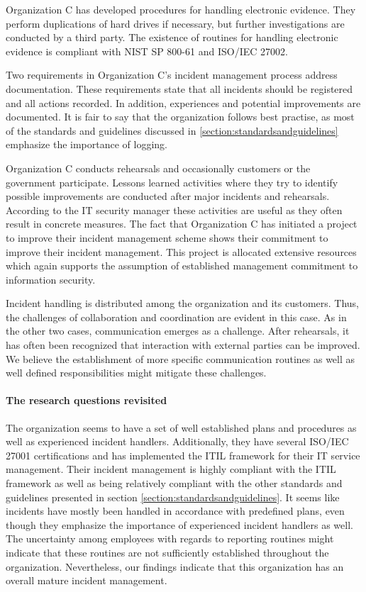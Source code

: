 Organization C has developed procedures for handling electronic evidence. They perform duplications of hard drives if necessary, but further investigations are conducted by a third party. The existence of routines for handling electronic evidence is compliant with NIST SP 800-61 and ISO/IEC 27002.

Two requirements in Organization C's incident management process address documentation. These requirements state that all incidents should be registered and all actions recorded. In addition, experiences and potential improvements are documented. It is fair to say that the organization follows best practise, as most of the standards and guidelines discussed in \ref{section:standardsandguidelines} emphasize the importance of logging.

Organization C conducts rehearsals and occasionally customers or the government participate. Lessons learned activities where they try to identify possible improvements are conducted after major incidents and rehearsals. According to the IT security manager these activities are useful as they often result in concrete measures. The fact that Organization C has initiated a project to improve their incident management scheme shows their commitment to improve their incident management. This project is allocated extensive resources which again supports the assumption of established management commitment to information security.

Incident handling is distributed among the organization and its customers. Thus, the challenges of collaboration and coordination are evident in this case. As in the other two cases, communication emerges as a challenge. After rehearsals, it has often been recognized that interaction with external parties can be improved. We believe the establishment of more specific communication routines as well as well defined responsibilities might mitigate these challenges.

\paragraph{The research questions revisited}
The organization seems to have a set of well established plans and procedures as well as experienced incident handlers. Additionally, they have several ISO/IEC 27001 certifications and has implemented the ITIL framework for their IT service management. Their incident management is highly compliant with the ITIL framework as well as being relatively compliant with the other standards and guidelines presented in section \ref{section:standardsandguidelines}. It seems like incidents have mostly been handled in accordance with predefined plans, even though they emphasize the importance of experienced incident handlers as well. The uncertainty among employees with regards to reporting routines might indicate that these routines are not sufficiently established throughout the organization. Nevertheless, our findings indicate that this organization has an overall mature incident management. 

